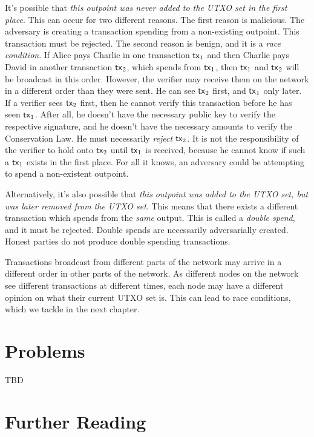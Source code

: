 It's possible that \emph{this outpoint was never added to the UTXO set in the first place}.
This can occur for two different reasons.
The first reason is malicious. The adversary is creating a transaction spending from
a non-existing outpoint. This transaction must be rejected.
The second reason is benign, and it is a \emph{race condition}.
If Alice pays Charlie in one transaction $\mathsf{tx}_1$ and then Charlie pays David in another
transaction $\mathsf{tx}_2$, which spends from $\mathsf{tx}_1$, then $\mathsf{tx}_1$ and $\mathsf{tx}_2$ will be broadcast
in this order. However, the verifier may receive them on the network
in a different order than they were sent. He can see $\mathsf{tx}_2$ first, and $\mathsf{tx}_1$ only later.
If a verifier sees $\mathsf{tx}_2$ first, then
he cannot verify this transaction before he has seen $\mathsf{tx}_1$. After all, he doesn't have
the necessary public key to verify the respective signature, and he doesn't have the
necessary amounts to verify the Conservation Law.
He must necessarily \emph{reject}
$\mathsf{tx}_2$. It is not
the responsibility of the verifier to hold onto $\mathsf{tx}_2$ until $\mathsf{tx}_1$ is received,
because he cannot know if such a $\mathsf{tx}_1$ exists in the first place. For all it knows,
an adversary could be attempting to spend a non-existent outpoint.

Alternatively, it's also possible that \emph{this outpoint was added to the UTXO set, but was later
removed from the UTXO set}. This means that there exists a different transaction
which spends from the \emph{same} output. This is called a \emph{double spend},
and it must be rejected. Double spends are necessarily adversarially created.
Honest parties do not produce double spending transactions.

Transactions broadcast from different parts of the network may arrive in a different order in other
parts of the network.
As different nodes on the network see different transactions
at different times, each node may have a different opinion on what their current UTXO set is.
This can lead to race conditions, which we tackle in the next chapter.

\section*{Problems}

TBD

\section*{Further Reading}

